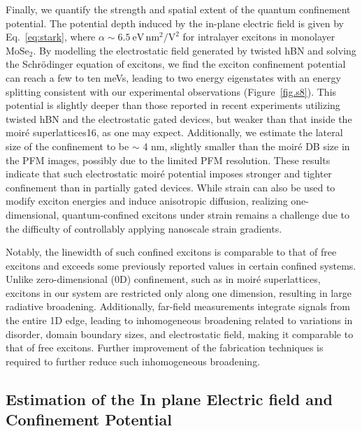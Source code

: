 Finally, we quantify the strength and spatial extent of the quantum confinement potential. 
The potential depth induced by the in-plane electric field is given by Eq.~\ref{eq:stark}, 
where $\alpha\sim 6.5~\text{eV}\,\text{nm}^2/\text{V}^2$ for intralayer excitons in monolayer MoSe$_2$\cite{Thureja2022-yc,Cavalcante2018-er}. 
By modelling the electrostatic field generated by twisted hBN and solving the Schrödinger equation of excitons, we find the exciton confinement potential can reach a few to ten meVs, leading to two energy eigenstates with an energy splitting consistent with our experimental observations (Figure~\ref{fig.s8}). 
This potential is slightly deeper than those reported in recent experiments utilizing twisted hBN\cite{Kim2025-jv,Kiper2025-ao} and the electrostatic gated devices\cite{Heithoff2024-su,Thureja2022-yc}, but weaker than that inside the moiré superlattices16, as one may expect. 
Additionally, we estimate the lateral size of the confinement to be $\sim$ 4 nm, slightly smaller than the moiré DB size in the PFM images, possibly due to the limited PFM resolution. 
These results indicate that such electrostatic moiré potential imposes stronger and tighter confinement than in partially gated devices\cite{Hu2024-ua, Heithoff2024-su,Thureja2022-yc,Wang2018-tm,Thureja2024-og}. 
While strain can also be used to modify exciton energies and induce anisotropic diffusion\cite{Dirnberger2021-xd}, realizing one-dimensional, quantum-confined excitons under strain remains a challenge due to the difficulty of controllably applying nanoscale strain gradients.

Notably, the linewidth of such confined excitons is comparable to that of free excitons and exceeds some previously reported values in certain confined systems\cite{Hu2024-ua,Thureja2022-yc,Seyler2019-ok,Liu2021-hj}. 
Unlike zero-dimensional (0D) confinement, such as in moiré superlattices\cite{Seyler2019-ok,Liu2021-hj}, excitons in our system are restricted only along one dimension, resulting in large radiative broadening. 
Additionally, far-field measurements integrate signals from the entire 1D edge, leading to inhomogeneous broadening related to variations in disorder, domain boundary sizes, and electrostatic field, making it comparable to that of free excitons. 
Further improvement of the fabrication techniques is required to further reduce such inhomogeneous broadening.

\subsection{Estimation of the In plane Electric field and Confinement Potential}

